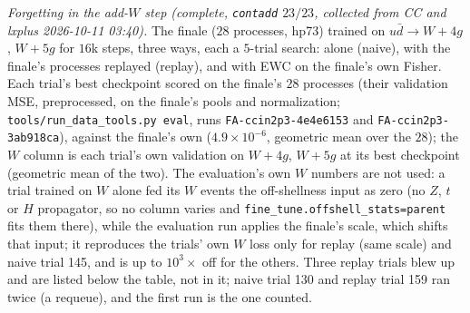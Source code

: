 \documentclass[11pt]{article}
\newcommand{\code}[1]{\texttt{#1}}
\begin{document}
\emph{Forgetting in the add-$W$ step (complete, \code{contadd} $23/23$, collected from CC and lxplus 2026-10-11 03:40).}
The finale ($28$ processes, hp73) trained on $u\bar d\to W+4g$, $W+5g$ for $16$k steps, three ways, each a $5$-trial
search: alone (naive), with the finale's processes replayed (replay), and with EWC on the finale's own Fisher. Each
trial's best checkpoint scored on the finale's $28$ processes (their validation MSE, preprocessed, on the finale's pools
and normalization; \code{tools/run\_data\_tools.py eval}, runs \code{FA-ccin2p3-4e4e6153} and \code{FA-ccin2p3-3ab918ca}),
against the finale's own ($4.9\times10^{-6}$, geometric mean over the $28$); the $W$ column is each trial's own
validation on $W+4g$, $W+5g$ at its best checkpoint (geometric mean of the two). The evaluation's own $W$ numbers are not
used: a trial trained on $W$ alone fed its $W$ events the off-shellness input as zero (no $Z$, $t$ or $H$ propagator, so
no column varies and \code{fine\_tune.offshell\_stats=parent} fits them there), while the evaluation run applies the
finale's scale, which shifts that input; it reproduces the trials' own $W$ loss only for replay (same scale) and naive
trial 145, and is up to $10^3\times$ off for the others. Three replay trials blew up and are listed below the table, not
in it; naive trial 130 and replay trial 159 ran twice (a requeue), and the first run is the one counted.
\end{document}
